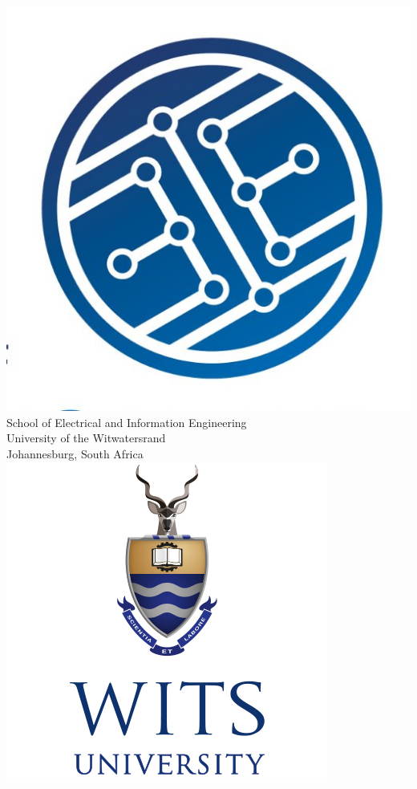 \begin{titlepage}
\begin{center}
\begin{paracol}{3}
	\hspace{-1cm}\includegraphics[scale = 0.2]{eie.jpg}
	\switchcolumn
	{\LARGE School of Electrical and Information Engineering}
	         {\large \\University of the Witwatersrand} 
	         {\small \\Johannesburg, South Africa}
	         \HRule \\[0.1cm]
	         \vspace{3cm}
	\switchcolumn
		\includegraphics[scale = 0.23]{wits-orig.png}
\end{paracol}


\end{center}
\end{titlepage}

